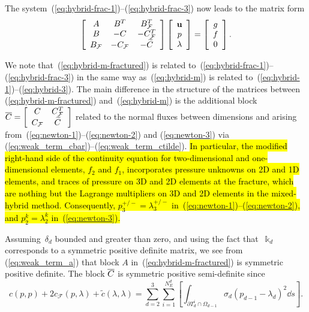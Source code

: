 The system~(\ref{eq:hybrid-frac-1})--(\ref{eq:hybrid-frac-3}) now leads to the
matrix form
\begin{equation}
\left[
\begin{array}
[c]{ccc}%
A & B^{T} & B_{\mathcal{F}}^{T}\\
B & -C & -C_{\mathcal{F}}^{T}\\
B_{\mathcal{F}} & -C_{\mathcal{F}} & -\widetilde{C}%
\end{array}
\right]  \left[
\begin{array}
[c]{c}%
\mathbf{u}\\
p\\
\lambda
\end{array}
\right]  =\left[
\begin{array}
[c]{c}%
g\\
f\\
0
\end{array}
\right]  . \label{eq:hybrid-m-fractured}%
\end{equation}


We note that~(\ref{eq:hybrid-m-fractured}) is related
to~(\ref{eq:hybrid-frac-1})--(\ref{eq:hybrid-frac-3}) in the same way
as~(\ref{eq:hybrid-m}) is related to~(\ref{eq:hybrid-1})--(\ref{eq:hybrid-3}).
The main difference in the structure of the matrices
between (\ref{eq:hybrid-m-fractured}) and~(\ref{eq:hybrid-m}) is the additional
block $\ol{C}=\left[
\begin{array}
[c]{cc}%
C & C_{\mathcal{F}}^{T}\\
C_{\mathcal{F}} & \widetilde{C}%
\end{array}
\right]  $ related to the normal fluxes between dimensions and arising
from~(\ref{eq:newton-1})--(\ref{eq:newton-2}) and (\ref{eq:newton-3}) via
(\ref{eq:weak_term_cbar})--(\ref{eq:weak_term_ctilde}).
\hl{
In particular, 
the modified right-hand side of the continuity equation for two-dimensional and one-dimensional  
elements, $f_{2}$ and $f_{1}$, incorporates pressure unknowns on 2D and 1D  elements, 
and traces of pressure on 3D and 2D elements at the fracture, 
which are nothing but the Lagrange multipliers on 3D and 2D elements in the mixed-hybrid method.
Consequently, 
$p_{3}^{+/-} = \lambda_{3}^{+/-}$ in~(\ref{eq:newton-1})--(\ref{eq:newton-2}), and $p_{2}^{k} = \lambda_{2}^{k}$ in~(\ref{eq:newton-3}).
}

Assuming~$\delta_{d}$ bounded and greater than zero, and using the fact
that~$\Bbbk_{d}$ corresponds to a symmetric positive definite matrix, we see
from (\ref{eq:weak_term_a}) that block $A$ in~(\ref{eq:hybrid-m-fractured}) is
symmetric positive definite. The block $\overline{C}$ is symmetric positive semi-definite
since
\begin{equation}
\label{eq:C_semi_definite}c(p,p) + 2c_{\mathcal{F}}(p,\lambda) +
\widetilde{c}(\lambda, \lambda) = \sum_{d=2}^{3}\sum_{i=1}^{N_{E}^{d}}\left[
\int_{\partial T_{d}^{i} \cap\Omega_{d-1}} \sigma_{d} (p_{d-1} - \lambda
_{d})^{2} \dd s \right]  .
\end{equation}

